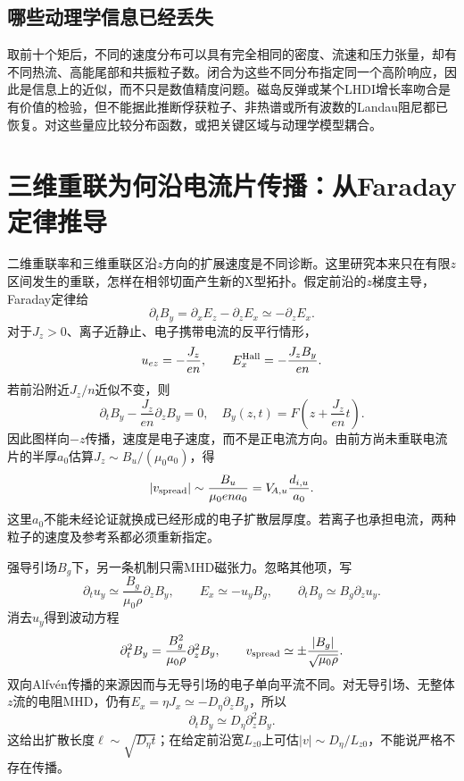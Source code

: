 \documentclass[UTF8,a4paper,11pt,openany,fontset=fandol]{ctexbook}
\begin{document}
\subsection{哪些动理学信息已经丢失}
取前十个矩后，不同的速度分布可以具有完全相同的密度、流速和压力张量，却有不同热流、高能尾部和共振粒子数。闭合为这些不同分布指定同一个高阶响应，因此是信息上的近似，而不只是数值精度问题。磁岛反弹或某个LHDI增长率吻合是有价值的检验，但不能据此推断俘获粒子、非热谱或所有波数的Landau阻尼都已恢复。对这些量应比较分布函数，或把关键区域与动理学模型耦合。

\section{三维重联为何沿电流片传播：从Faraday定律推导}
二维重联率和三维重联区沿$z$方向的扩展速度是不同诊断。这里研究本来只在有限$z$区间发生的重联，怎样在相邻切面产生新的X型拓扑。假定前沿的$z$梯度主导，Faraday定律给
\begin{equation}
\partial_tB_y=\partial_xE_z-\partial_zE_x\simeq-\partial_zE_x.
\end{equation}
对于$J_z>0$、离子近静止、电子携带电流的反平行情形，
\begin{equation}
 u_{ez}=-\frac{J_z}{en},\qquad E_x^{\rm Hall}=-\frac{J_zB_y}{en}.
\end{equation}
若前沿附近$J_z/n$近似不变，则
\begin{equation}
 \partial_tB_y-\frac{J_z}{en}\partial_zB_y=0,
 \quad B_y(z,t)=F\left(z+\frac{J_z}{en}t\right).
\end{equation}
因此图样向$-z$传播，速度是电子速度，而不是正电流方向。由前方尚未重联电流片的半厚$a_0$估算$J_z\sim B_u/(\mu_0a_0)$，得
\begin{equation}
 |v_{\rm spread}|\sim \frac{B_u}{\mu_0ena_0}
 =V_{\!A,u}\frac{d_{i,u}}{a_0}.
\end{equation}
这里$a_0$不能未经论证就换成已经形成的电子扩散层厚度。若离子也承担电流，两种粒子的速度及参考系都必须重新指定。

强导引场$B_g$下，另一条机制只需MHD磁张力。忽略其他项，写
\begin{equation}
 \partial_tu_y\simeq\frac{B_g}{\mu_0\rho}\partial_zB_y,
 \qquad E_x\simeq-u_yB_g,\qquad
 \partial_tB_y\simeq B_g\partial_zu_y.
\end{equation}
消去$u_y$得到波动方程
\begin{equation}
 \partial_t^2B_y=\frac{B_g^2}{\mu_0\rho}\partial_z^2B_y,
 \qquad v_{\rm spread}\simeq\pm\frac{|B_g|}{\sqrt{\mu_0\rho}}.
\end{equation}
双向Alfvén传播的来源因而与无导引场的电子单向平流不同。对无导引场、无整体$z$流的电阻MHD，仍有$E_x=\eta J_x\simeq- D_\eta\partial_zB_y$，所以
\begin{equation}
 \partial_tB_y\simeq D_\eta\partial_z^2B_y.
\end{equation}
这给出扩散长度$\ell\sim\sqrt{D_\eta t}$；在给定前沿宽$L_{z0}$上可估$|v|\sim D_\eta/L_{z0}$，不能说严格不存在传播。
\end{document}
